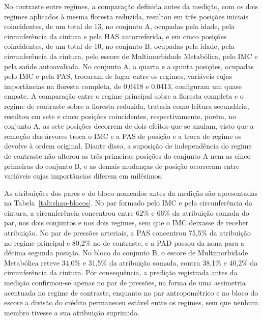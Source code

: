 No contraste entre regimes, a comparação definida antes da medição, com os dois regimes aplicados à mesma floresta reduzida, resultou em três posições iniciais coincidentes, de um total de 13, no conjunto A, ocupadas pela idade, pela circunferência da cintura e pela HAS autorreferida, e em cinco posições coincidentes, de um total de 10, no conjunto B, ocupadas pela idade, pela circunferência da cintura, pelo escore de Multimorbidade Metabólica, pelo IMC e pela saúde autoavaliada. No conjunto A, a quarta e a quinta posições, ocupadas pelo IMC e pela PAS, trocaram de lugar entre os regimes, variáveis cujas importâncias na floresta completa, de 0,0418 e 0,0413, configuram um quase empate. A comparação entre o regime principal sobre a floresta completa e o regime de contraste sobre a floresta reduzida, tratada como leitura secundária, resultou em sete e cinco posições coincidentes, respectivamente, porém, no conjunto A, as sete posições decorrem de dois efeitos que se anulam, visto que a remoção das árvores troca o IMC e a PAS de posição e a troca de regime os devolve à ordem original. Diante disso, a suposição de independência do regime de contraste não alterou as três primeiras posições do conjunto A nem as cinco primeiras do conjunto B, e as demais mudanças de posição ocorreram entre variáveis cujas importâncias diferem em milésimos.

As atribuições dos pares e do bloco nomeados antes da medição são apresentadas na Tabela~\ref{tab:shap-blocos}. No par formado pelo IMC e pela circunferência da cintura, a circunferência concentrou entre 62\% e 66\% da atribuição somada do par, nos dois conjuntos e nos dois regimes, sem que o IMC deixasse de receber atribuição. No par de pressões arteriais, a PAS concentrou 75,5\% da atribuição no regime principal e 80,2\% no de contraste, e a PAD passou da nona para a décima segunda posição. No bloco do conjunto B, o escore de Multimorbidade Metabólica reteve 34,0\% e 31,5\% da atribuição somada, contra 38,1\% e 40,2\% da circunferência da cintura. Por consequência, a predição registrada antes da medição confirmou-se apenas no par de pressões, na forma de uma assimetria acentuada no regime de contraste, enquanto no par antropométrico e no bloco do escore a divisão do crédito permaneceu estável entre os regimes, sem que nenhum membro tivesse a sua atribuição suprimida.

